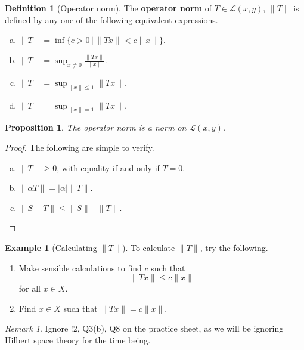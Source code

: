 \documentclass[10pt, oneside, reqno]{amsbook}
\theoremstyle{plain}%
\newtheorem{prop}[thm]{Proposition}
\theoremstyle{definition}
\newtheorem{defn}[thm]{Definition}
\newtheorem{exmp}[thm]{Example}
\theoremstyle{remark}
\newtheorem*{rem}{Remark}
\begin{document}
\begin{defn}[Operator norm]
    The \textbf{operator norm} of $T \in \mathcal{L}(x,y)$, $\| T\|$ is defined by any one of the following equivalent expressions.
    \begin{enumerate}[(a)]
        \item $\|T \| = \inf \{ c > 0 \, | \, \| Tx \| < c \| x \| \}$.
        \item $\| T\| = \sup_{x \neq 0} \frac{ \|Tx \|}{\| x \|}$.
        \item $\| T \| = \sup_{ \|x \| \leq 1} \| Tx \|$.
        \item $\| T \| = \sup_{\| x \| = 1} \|T x \|$.
    \end{enumerate}
\end{defn}

\begin{prop}
    The operator norm is a norm on $\mathcal{L}(x,y)$.  
\end{prop}

\begin{proof}  The following are simple to verify.
    \begin{enumerate}[(a)]
        \item $\| T \| \geq 0$, with equality if and only if $ T = 0$. 
        \item $\| \alpha T \| = | \alpha | \|T \|$.
        \item $\| S + T \| \leq  \| S \| + \| T \|$.
    \end{enumerate}
\end{proof}

\begin{exmp}[Calculating $\| T \|$]
    To calculate $\| T \|$, try the following. 
    \begin{enumerate}[1)]
        \item Make sensible calculations to find $c$ such that \[
            \| Tx \| \leq c \| x \|
        \] for all $x \in X$.
        \item Find $x \in X$ such that $\|Tx \| = c \| x \|$.
    \end{enumerate}
\end{exmp}
% 

\begin{rem}
    Ignore !2, Q3(b), Q8 on the practice sheet, as we will be ignoring Hilbert space theory for the time being.
\end{rem}
\end{document}
